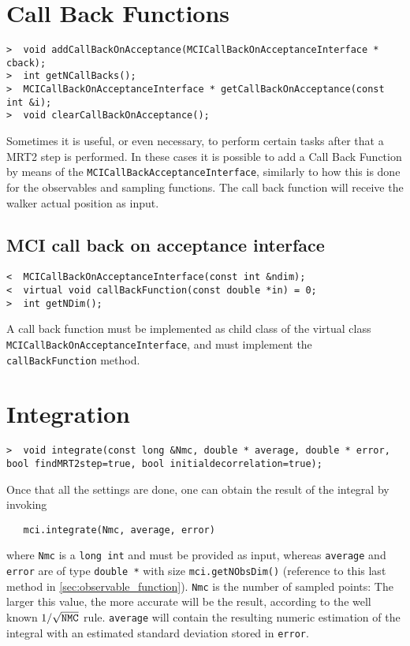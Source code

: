 \documentclass[11pt,a4paper,twoside]{article}
\begin{document}
\section{Call Back Functions}
\label{sec:call_back_functions}
\begin{verbatim}
>  void addCallBackOnAcceptance(MCICallBackOnAcceptanceInterface * cback);
>  int getNCallBacks();
>  MCICallBackOnAcceptanceInterface * getCallBackOnAcceptance(const int &i);
>  void clearCallBackOnAcceptance();
\end{verbatim}

Sometimes it is useful, or even necessary, to perform certain tasks after that a MRT2 step is performed.
In these cases it is possible to add a Call Back Function by means of the \verb+MCICallBackAcceptanceInterface+, similarly to how this is done for the observables and sampling functions.
The call back function will receive the walker actual position as input.


\subsection{MCI call back on acceptance interface}
\label{sub:mci_call_back_on_acceptance_interface}

\begin{verbatim}
<  MCICallBackOnAcceptanceInterface(const int &ndim);
<  virtual void callBackFunction(const double *in) = 0;
>  int getNDim();
\end{verbatim}

A call back function must be implemented as child class of the virtual class \verb+MCICallBackOnAcceptanceInterface+, and must implement the \verb+callBackFunction+ method.







\section{Integration} %
\label{sec:integration}

\begin{verbatim}
>  void integrate(const long &Nmc, double * average, double * error, bool findMRT2step=true, bool initialdecorrelation=true);
\end{verbatim}

Once that all the settings are done, one can obtain the result of the integral by invoking
\begin{verbatim}
   mci.integrate(Nmc, average, error)
\end{verbatim}
where \verb+Nmc+ is a \verb+long int+ and must be provided as input, whereas \verb+average+ and \verb+error+ are of type \verb+double *+ with size \verb+mci.getNObsDim()+ (reference to this last method in \ref{sec:observable_function}).
\verb+Nmc+ is the number of sampled points: The larger this value, the more accurate will be the result, according to the well known $1/\sqrt{\verb+NMC+}$ rule.
\verb+average+ will contain the resulting numeric estimation of the integral with an estimated standard deviation stored in \verb+error+.
\end{document}

